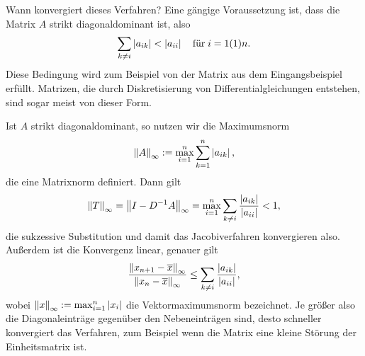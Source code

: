 Wann konvergiert dieses Verfahren? Eine gängige Voraussetzung ist,
dass die Matrix $A$ strikt diagonaldominant ist, also
\begin{equation}
  \sum_{k\neq i} \left\lvert{a_{ik}}\right\rvert < \left\lvert{a_{ii}}\right\rvert\quad\text{für}\; i=1(1)n.
\end{equation}
Diese Bedingung wird zum Beispiel von der Matrix aus dem
Eingangsbeispiel erfüllt.  Matrizen, die durch Diskretisierung von
Differentialgleichungen entstehen, sind sogar meist von dieser Form.

Ist $A$ strikt diagonaldominant, so nutzen wir die Maximumsnorm
\begin{equation}
  \left\lVert{A}\right\rVert_\infty := \max_{i=1}^n \sum_{k=1}^n \left\lvert{a_{ik}}\right\rvert,
\end{equation}
die eine Matrixnorm definiert. Dann gilt
\begin{equation}
  \left\lVert{T}\right\rVert_{\infty} = \left\lVert{I-D^{-1}A}\right\rVert_{\infty} =
  \max_{i=1}^n \sum_{k\neq i} \frac{\left\lvert{a_{ik}}\right\rvert}{\left\lvert{a_{ii}}\right\rvert} < 1,
\end{equation}
die sukzessive Substitution und damit das Jacobiverfahren konvergieren
also. Außerdem ist die Konvergenz linear, genauer gilt
\begin{equation}
  \frac{\left\lVert{x_{n+1} - \overline{x}}\right\rVert_\infty}{\left\lVert{x_{n} - \overline{x}}\right\rVert_\infty}
  \le \sum_{k\neq i} \frac{\left\lvert{a_{ik}}\right\rvert}{\left\lvert{a_{ii}}\right\rvert},
\end{equation}
wobei $\left\lVert{x}\right\rVert_\infty := \max_{i=1}^n \left\lvert{x_i}\right\rvert$ die
Vektormaximumsnorm bezeichnet. Je größer also die Diagonaleinträge
gegenüber den Nebeneinträgen sind, desto schneller konvergiert das
Verfahren, zum Beispiel wenn die Matrix eine kleine Störung der
Einheitsmatrix ist.

\subsection{}

